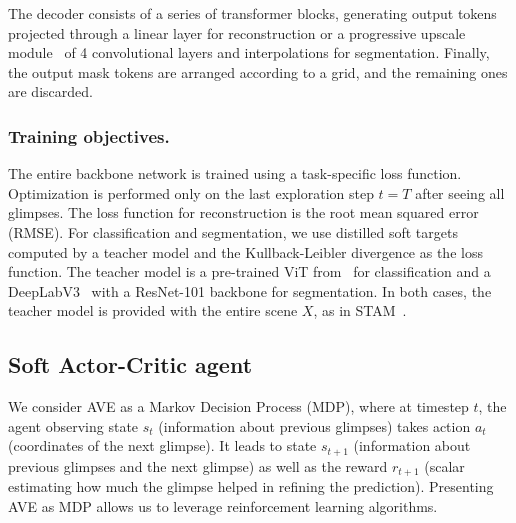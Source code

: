 \documentclass[runningheads]{llncs}
\begin{document}
The decoder consists of a series of transformer blocks, generating output tokens projected through a linear layer for reconstruction or a progressive upscale module~\cite{zheng2021rethinking} of 4 convolutional layers and interpolations for segmentation. Finally, the output mask tokens are arranged according to a grid, and the remaining ones are discarded.

\subsubsection{Training objectives.}
The entire backbone network is trained using a task-specific loss function. Optimization is performed only on the last exploration step $t=T$ after seeing all glimpses. The loss function for reconstruction is the root mean squared error (RMSE). For classification and segmentation, we use distilled soft targets computed by a teacher model and the Kullback-Leibler divergence as the loss function. The teacher model is a pre-trained ViT from~\cite{touvron2022deit} for classification and a DeepLabV3~\cite{chen2017rethinking} with a ResNet-101 backbone for segmentation. In both cases, the teacher model is provided with the entire scene $X$, as in STAM~\cite{rangrej2022consistency}.

\subsection{Soft Actor-Critic agent}
\label{sec:rl}

We consider AVE as a Markov Decision Process (MDP), where at timestep $t$, the agent observing state $s_{t}$ (information about previous glimpses) takes action $a_t$ (coordinates of the next glimpse). It leads to state $s_{t+1}$ (information about previous glimpses and the next glimpse) as well as the reward $r_{t+1}$ (scalar estimating how much the glimpse helped in refining the prediction). Presenting AVE as MDP allows us to leverage reinforcement learning algorithms.
\end{document}
